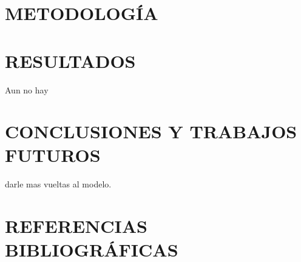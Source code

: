 \documentclass[12pt,a4paper]{article}
\begin{document}
\section{METODOLOGÍA}
             

\section{RESULTADOS}
	Aun no hay

\section{CONCLUSIONES Y TRABAJOS FUTUROS}
	 darle mas vueltas al modelo.
\section{REFERENCIAS BIBLIOGRÁFICAS}

\printbibliography


\newpage

%
\end{document}
